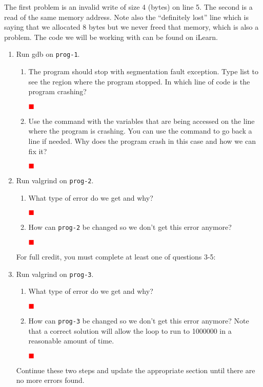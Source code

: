 \documentclass[12pt]{article}
\newcounter{problem}
\newenvironment{solution}{\par\textcolor{green!50!black}\bgroup}{\egroup\par}
\newcommand{\TODO}{\textcolor{red}{$\blacksquare$}}
\begin{document}
The first problem is an invalid write of size 4 (bytes) on line 5. The second is
a read of the same memory address. Note also the ``definitely lost'' line which
is saying that we allocated 8 bytes but we never freed that memory, which is also
a problem.  The code we will be working with can be found on iLearn.

\begin{enumerate}
\item Run gdb on \texttt{prog-1}.
\begin{enumerate}
\item The program should stop with segmentation fault exception. Type list to
  see the region where the program stopped. In which line of code is the program
  crashing?
  \begin{solution}
  \textbf{\textcolor{red}{\TODO}}
  \end{solution}
\item Use the command  with the variables that are being
  accessed on the line where the program is crashing. You can use the 
  command to go back a line if needed. Why does the program crash in this case
  and how we can fix it?
  \begin{solution}
  \textbf{\textcolor{red}{\TODO}}
  \end{solution}
\end{enumerate}

\item Run valgrind on \texttt{prog-2}.
  \begin{enumerate}
  \item What type of error do we get and why?
    \begin{solution}
  \textbf{\textcolor{red}{\TODO}}
    \end{solution}
  \item How can \texttt{prog-2} be changed so we don't get this error anymore?
    \begin{solution}
  \textbf{\textcolor{red}{\TODO}}
    \end{solution}
  \end{enumerate}

\pagebreak
For full credit, you must complete at least one of questions 3-5:

\item Run valgrind on \texttt{prog-3}.
\begin{enumerate}
\item What type of error do we get and why?
  \begin{solution}
  \textbf{\textcolor{red}{\TODO}}
  \end{solution}
\item How can \texttt{prog-3} be changed so we don't get this error anymore?
  Note that a correct solution will allow the loop to run to 1000000 in a
  reasonable amount of time.
  \begin{solution}
  \textbf{\textcolor{red}{\TODO}}
  \end{solution}
\end{enumerate}
Continue these two steps and update the appropriate section until there are no more errors found.


\end{enumerate}
\end{document}
